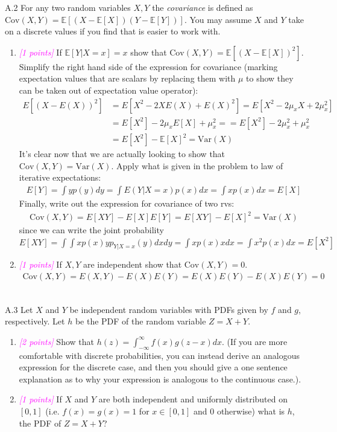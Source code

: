 \documentclass{article}
\newcommand{\1}{\mathbf{1}}
\newcommand{\E}{\mathbb{E}}
\newcommand{\points}[1]{\small\textcolor{magenta}{\emph{[#1 points]}} \normalsize}
\begin{document}
A.2 For any two random variables $X,Y$ the \emph{covariance} is defined as $\text{Cov}(X,Y)=\E[(X-\E[X])(Y-\E[Y])]$. You may assume $X$ and $Y$ take on a discrete values if you find that is easier to work with.
    \begin{enumerate}
         \item \points{1} If $\E[Y|X=x] = x$ show that $\text{Cov}(X,Y) = \E[(X-\E[X])^2]$. 
         Simplify the right hand side of the expression for covariance (marking expectation values that are scalars by replacing them with $\mu$ to show they can be taken out of expectation value operator):
             \begin{align*}
                 E[(X-E(X))^2] &= E[ X^2 - 2XE(X) + E(X)^2 ] = E[X^2 - 2\mu_xX + 2\mu_x^2] \\
                 &=E[X^2] - 2\mu_xE[X] + \mu_x^2 = =E[X^2] - 2\mu_x^2 + \mu_x^2 \\
                 &=E[X^2]-\E[X]^2 = \text{Var}(X)
             \end{align*}
         It's clear now that we are actually looking to show that $\text{Cov}(X,Y)=\text{Var}(X)$. Apply what is given in the problem to law of iterative expectations: 
             \begin{align*}
                 E[Y] = \int yp(y)dy = \int E(Y|X=x)p(x) dx = \int xp(x)dx = E[X]
             \end{align*}
         Finally, write out the expression for covariance of two rvs:
             \begin{align*}
                 \text{Cov}(X,Y) = E[XY] - E[X]E[Y] = E[XY] - E[X]^2 = \text{Var}(X)
             \end{align*}
         since we can write the joint probability $E[XY]=\int\int xp(x)yp_{Y|X=x}(y)dxdy = \int xp(x)x dx = \int x^2p(x)dx = E[X^2]$
         \item \points{1} If $X,Y$ are independent show that $\text{Cov}(X,Y)=0$.
             \begin{align*}
                 \text{Cov}(X,Y) = E(X,Y) - E(X)E(Y) = E(X)E(Y) - E(X)E(Y) = 0
             \end{align*}
\end{enumerate}\\

A.3 Let $X$ and $Y$ be independent random variables with PDFs given by $f$ and $g$, respectively. Let $h$ be the PDF of the random variable $Z = X+Y$.
\begin{enumerate}
	\item \points{2} Show that $h(z) = \int_{-\infty}^\infty f(x) g( z - x ) d x $.  (If you are more comfortable with discrete probabilities, you can instead derive an analogous expression for the discrete case,  and then you should give a one sentence explanation as to why your expression is analogous to the continuous case.).
	\item \points{1} If $X$ and $Y$ are both independent and uniformly distributed on $[0,1]$ (i.e. $f(x)=g(x)=1$ for $x \in [0,1]$ and $0$ otherwise) what is $h$, the PDF of $Z=X+Y$?
\end{enumerate}\\
\end{document}
